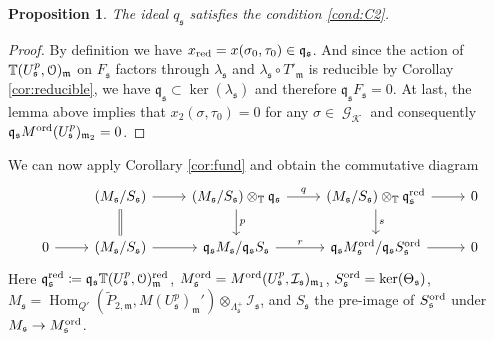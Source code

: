 \documentclass[leqno]{amsart}
\newtheorem{prop}[thm]{Proposition}
\theoremstyle{definition}
\theoremstyle{remark}
\newcommand{\eo}{\EuScript{O}}
\DeclareMathOperator{\Hom}{Hom}
\DeclareMathOperator{\Gal}{\mathcal{G}}
\newcommand{\fm}{\mathfrak{m}}
\newcommand{\fq}{\mathfrak{q}}
\newcommand{\fs}{\mathfrak{s}}
\newcommand{\red}{\textnormal{red}}
\newcommand{\xx}{x_\textnormal{red}}
\newcommand{\K}{{\mathcal{K}}} %
\newcommand{\TT}{\mathbb{T}} %
\newcommand{\I}{\mathcal{I}} %
\newcommand{\ord}{\textnormal{ord}} %
\begin{document}
\begin{prop}
The ideal  $q_{\fs}$
satisfies the condition \ref{cond:C2}.
\end{prop}

\begin{proof}

By definition we have $\xx=x(\sigma_0,\tau_0)\in \fq_\fs$.
And since the action of $\TT(U^p_\fs,\eo)_\fm$
on $F_\fs$ factors through $\lambda_\fs$
and $\lambda_\fs\circ T'_\fm$ is reducible 
by Corollay \ref{cor:reducible},
we have $\fq_\fs\subset \ker(\lambda_\fs)$ and 
therefore $\fq_\fs F_\fs=0$.
At last, the lemma above
implies that $x_2(\sigma, \tau_0)=0$
for any $\sigma\in\Gal_\K$
and consequently
$\fq_\fs M^{\ord}(U^p_\fs)_{\fm_2}=0$.
\end{proof}


We can now apply Corollary \ref{cor:fund}
and obtain the commutative diagram
\begin{equation}\label{eq:comm_s}
    \begin{tikzcd}
    & (M_\fs/S_\fs)
    \arrow[r]\arrow[d,equal] &
    (M_\fs/S_\fs)\otimes_{\TT}\fq_\fs
    \arrow[r,"q"]\arrow[d,"p"] &
    (M_\fs/S_\fs)\otimes_{\TT}\fq_\fs^\red
    \arrow[r]\arrow[d,"s"] &0\\
    0\arrow[r] &
    (M_\fs/S_\fs)
    \arrow[r] &
    \fq_\fs M_\fs/\fq_\fs S_\fs
    \arrow[r,"r"] &
    \fq_\fs M^{\ord}_{\fs}/\fq_\fs S^{\ord}_{\fs}
    \arrow[r] &0
    \end{tikzcd}
\end{equation}
Here $\fq_\fs^\red\coloneqq\fq_\fs\TT(U^p_\fs,\eo)_\fm^{\red}$,
$M^{\ord}_{\fs}=M^{\ord}(U^p_\fs,\I_\fs)_{\fm_1}$,
$S^{\ord}_{\fs}=\ker(\Theta_\fs)$,
$M_\fs=\Hom_{Q'}(\tilde{P}_{2,\fm},M(U^p_\fs)_{\fm}')
\otimes_{\Lambda_{\fs}^+}\I_\fs$,
and $S_\fs$ the pre-image of $S^{\ord}_\fs$
under $M_\fs\to M^{\ord}_\fs$.
\end{document}
